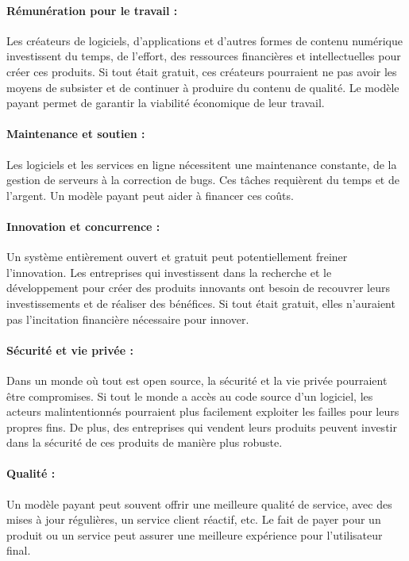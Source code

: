 \paragraph{Rémunération pour le travail :} Les créateurs de logiciels, d'applications et d'autres formes de contenu numérique investissent du temps, de l'effort, des ressources financières et intellectuelles pour créer ces produits. Si tout était gratuit, ces créateurs pourraient ne pas avoir les moyens de subsister et de continuer à produire du contenu de qualité. Le modèle payant permet de garantir la viabilité économique de leur travail.

\paragraph{Maintenance et soutien :} Les logiciels et les services en ligne nécessitent une maintenance constante, de la gestion de serveurs à la correction de bugs. Ces tâches requièrent du temps et de l'argent. Un modèle payant peut aider à financer ces coûts.

\paragraph{Innovation et concurrence :} Un système entièrement ouvert et gratuit peut potentiellement freiner l'innovation. Les entreprises qui investissent dans la recherche et le développement pour créer des produits innovants ont besoin de recouvrer leurs investissements et de réaliser des bénéfices. Si tout était gratuit, elles n'auraient pas l'incitation financière nécessaire pour innover.


\paragraph{Sécurité et vie privée :} Dans un monde où tout est open source, la sécurité et la vie privée pourraient être compromises. Si tout le monde a accès au code source d'un logiciel, les acteurs malintentionnés pourraient plus facilement exploiter les failles pour leurs propres fins. De plus, des entreprises qui vendent leurs produits peuvent investir dans la sécurité de ces produits de manière plus robuste.

\paragraph{Qualité :} Un modèle payant peut souvent offrir une meilleure qualité de service, avec des mises à jour régulières, un service client réactif, etc. Le fait de payer pour un produit ou un service peut assurer une meilleure expérience pour l'utilisateur final.

